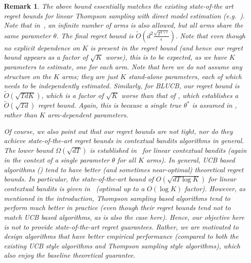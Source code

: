\documentclass[letterpaper]{article} %
\newtheorem{remark}{Remark}
\begin{document}
\begin{remark}
The above bound essentially matches the existing state-of-the art regret bounds for linear Thompson sampling with direct model estimation (e.g.~\cite{agrawal-lints}). Note that in~\cite{agrawal-lints},
an infinite number of arms is also allowed, but all arms share the same parameter $\theta$. The final regret bound is $\tilde{O}\left(d^2 \frac{\sqrt{T^{1+\epsilon}}}{\epsilon}\right)$. Note that even though no explicit dependence on $K$ is present in the regret bound (and hence our regret bound appears as a factor of $\sqrt{K}$ worse), this is to be expected, as we have $K$ parameters to estimate, one for each arm. Note that here we do not assume any structure on the $K$ arms; they are just $K$ stand-alone parameters, each of which needs to be independently estimated.
Similarly, for BLUCB, our regret bound is $\tilde{O}\left(\sqrt{TdK}\right)$,
which is a factor of $\sqrt{K}$ worse than that of \cite{chu2011contextual},
which establishes a $\tilde{O}\left(\sqrt{Td}\right)$ regret bound.
Again, this is because a single true $\theta^*$ is assumed in \cite{chu2011contextual}, rather than $K$ arm-dependent parameters.

Of course, we also point out that our regret bounds are not tight, nor do they achieve state-of-the-art regret bounds in contextual bandits algorithms in general.
The lower bound $\Omega({\sqrt{dT}})$ is established in~\cite{chu2011contextual} for linear contextual bandits (again in the context of a single parameter $\theta$ for all $K$ arms).
In general, UCB based algorithms (\cite{auer-linrel,chu2011contextual,bubeck2012regret,abbasi2011improved}) tend to have better
(and sometimes near-optimal) theoretical regret bounds.
In particular, the state-of-the-art bound of $O(\sqrt{dT\log K})$ for linear contextual bandits is given
in~\cite{bubeck2012regret} (optimal up to a $O(\log K)$ factor).
However, as mentioned in the introduction, Thompson sampling based algorithms tend to perform much better in practice (even though their regret bounds tend not to match UCB based algorithms, as is also the case here). Hence, our objective here is not to provide
state-of-the-art regret guarantees. Rather, we are motivated to design algorithms that have better empirical performance (compared to both the existing UCB style algorithms and Thompson sampling style algorithms), which also enjoy the baseline theoretical guarantee.


\end{remark}
\end{document}
